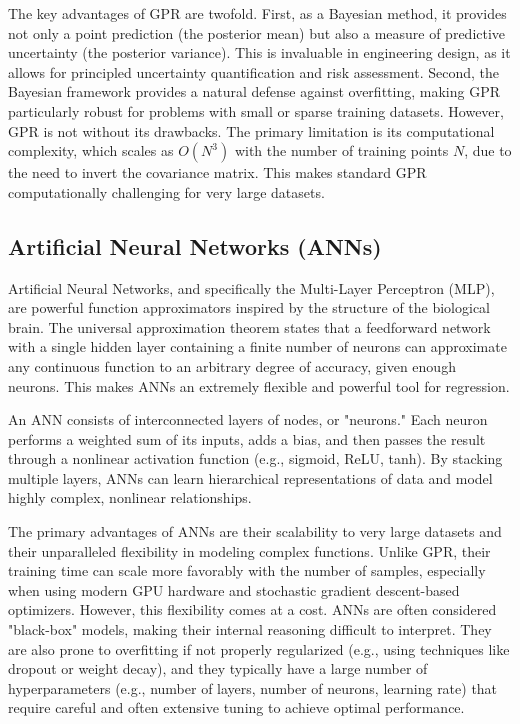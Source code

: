 \documentclass[dsc, EN]{ufabcFHZh}
\begin{document}
{The key advantages of GPR are twofold. First, as a Bayesian method, it provides not only a point prediction (the posterior mean) but also a measure of predictive uncertainty (the posterior variance). This is invaluable in engineering design, as it allows for principled uncertainty quantification and risk assessment. Second, the Bayesian framework provides a natural defense against overfitting, making GPR particularly robust for problems with small or sparse training datasets. However, GPR is not without its drawbacks. The primary limitation is its computational complexity, which scales as $O(N^3)$ with the number of training points $N$, due to the need to invert the covariance matrix. This makes standard GPR computationally challenging for very large datasets.

\subsection{Artificial Neural Networks (ANNs)}

Artificial Neural Networks, and specifically the Multi-Layer Perceptron (MLP), are powerful function approximators inspired by the structure of the biological brain. The universal approximation theorem states that a feedforward network with a single hidden layer containing a finite number of neurons can approximate any continuous function to an arbitrary degree of accuracy, given enough neurons. This makes ANNs an extremely flexible and powerful tool for regression.

An ANN consists of interconnected layers of nodes, or "neurons." Each neuron performs a weighted sum of its inputs, adds a bias, and then passes the result through a nonlinear activation function (e.g., sigmoid, ReLU, tanh). By stacking multiple layers, ANNs can learn hierarchical representations of data and model highly complex, nonlinear relationships.

The primary advantages of ANNs are their scalability to very large datasets and their unparalleled flexibility in modeling complex functions. Unlike GPR, their training time can scale more favorably with the number of samples, especially when using modern GPU hardware and stochastic gradient descent-based optimizers. However, this flexibility comes at a cost. ANNs are often considered "black-box" models, making their internal reasoning difficult to interpret. They are also prone to overfitting if not properly regularized (e.g., using techniques like dropout or weight decay), and they typically have a large number of hyperparameters (e.g., number of layers, number of neurons, learning rate) that require careful and often extensive tuning to achieve optimal performance. 

}
\end{document}
